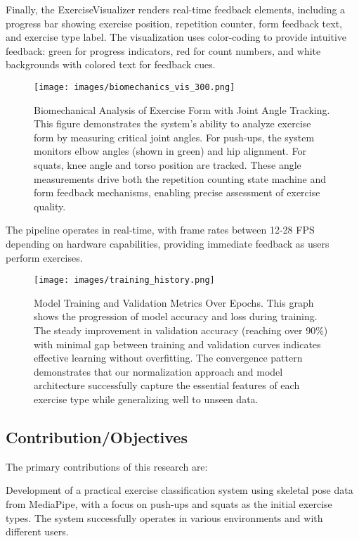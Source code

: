 \documentclass[11pt]{article}
\begin{document}
Finally, the ExerciseVisualizer renders real-time feedback elements, including a progress bar showing exercise position, repetition counter, form feedback text, and exercise type label. The visualization uses color-coding to provide intuitive feedback: green for progress indicators, red for count numbers, and white backgrounds with colored text for feedback cues.

\begin{figure}[htbp]
    \centering
    \texttt{[image: images/biomechanics\_vis\_300.png]}
    \caption{Biomechanical Analysis of Exercise Form with Joint Angle Tracking. This figure demonstrates the system's ability to analyze exercise form by measuring critical joint angles. For push-ups, the system monitors elbow angles (shown in green) and hip alignment. For squats, knee angle and torso position are tracked. These angle measurements drive both the repetition counting state machine and form feedback mechanisms, enabling precise assessment of exercise quality.}
    \label{fig:biomechanics_vis}
\end{figure}

The pipeline operates in real-time, with frame rates between 12-28 FPS depending on hardware capabilities, providing immediate feedback as users perform exercises.

\begin{figure}[htbp]
    \centering
    \texttt{[image: images/training\_history.png]}
    \caption{Model Training and Validation Metrics Over Epochs. This graph shows the progression of model accuracy and loss during training. The steady improvement in validation accuracy (reaching over 90\%) with minimal gap between training and validation curves indicates effective learning without overfitting. The convergence pattern demonstrates that our normalization approach and model architecture successfully capture the essential features of each exercise type while generalizing well to unseen data.}
    \label{fig:training_history}
\end{figure}

\subsection{Contribution/Objectives}
The primary contributions of this research are:

Development of a practical exercise classification system using skeletal pose data from MediaPipe, with a focus on push-ups and squats as the initial exercise types. The system successfully operates in various environments and with different users.
\end{document}
